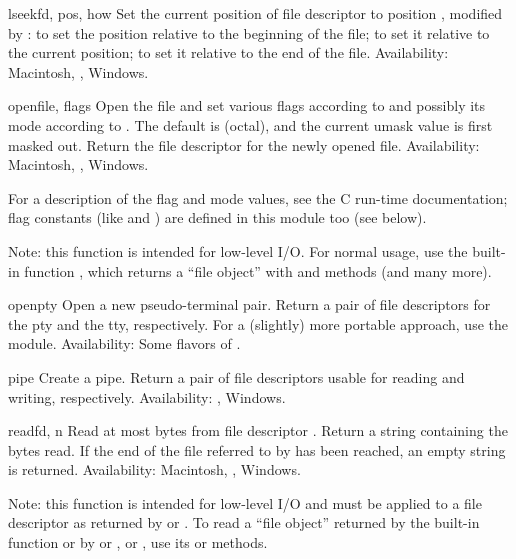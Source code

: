 \begin{funcdesc}{lseek}{fd, pos, how}
Set the current position of file descriptor  to position
, modified by :  to set the position
relative to the beginning of the file;  to set it relative to
the current position;  to set it relative to the end of the
file.
Availability: Macintosh, \UNIX, Windows.
\end{funcdesc}

\begin{funcdesc}{open}{file, flags}
Open the file  and set various flags according to
 and possibly its mode according to .
The default  is  (octal), and the current umask
value is first masked out.  Return the file descriptor for the newly
opened file.
Availability: Macintosh, \UNIX, Windows.

For a description of the flag and mode values, see the C run-time
documentation; flag constants (like  and
) are defined in this module too (see below).

Note: this function is intended for low-level I/O.  For normal usage,
use the built-in function , which returns a ``file
object'' with  and  methods (and many
more).
\end{funcdesc}

\begin{funcdesc}{openpty}{}
Open a new pseudo-terminal pair. Return a pair of file descriptors
 for the pty and the tty,
respectively. For a (slightly) more portable approach, use the
 module.
Availability: Some flavors of \UNIX.
\end{funcdesc}

\begin{funcdesc}{pipe}{}
Create a pipe.  Return a pair of file descriptors  usable for reading and writing, respectively.
Availability: \UNIX, Windows.
\end{funcdesc}

\begin{funcdesc}{read}{fd, n}
Read at most  bytes from file descriptor .
Return a string containing the bytes read.  If the end of the file
referred to by  has been reached, an empty string is
returned.
Availability: Macintosh, \UNIX, Windows.

Note: this function is intended for low-level I/O and must be applied
to a file descriptor as returned by  or
.  To read a ``file object'' returned by the
built-in function  or by  or
, or , use its
 or  methods.
\end{funcdesc}


